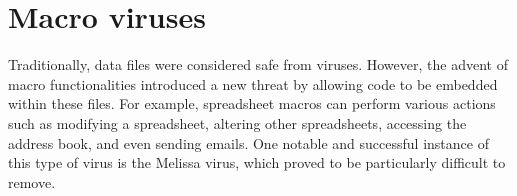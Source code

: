 \section{Macro viruses}

Traditionally, data files were considered safe from viruses. 
However, the advent of macro functionalities introduced a new threat by allowing code to be embedded within these files. 
For example, spreadsheet macros can perform various actions such as modifying a spreadsheet, altering other spreadsheets, accessing the address book, and even sending emails. 
One notable and successful instance of this type of virus is the Melissa virus, which proved to be particularly difficult to remove.